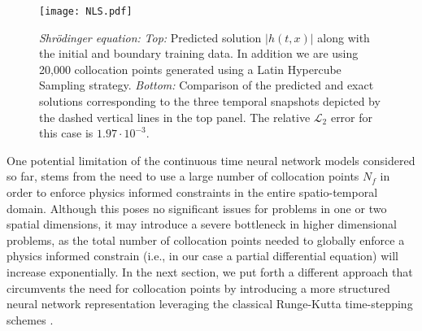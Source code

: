 \begin{figure}[!t]
\texttt{[image: NLS.pdf]}
\caption{{\em Shr\"{o}dinger equation:} {\it Top:} Predicted solution $|h(t,x)|$ along with the initial and boundary training data. In addition we are using 20,000 collocation points generated using a Latin Hypercube Sampling strategy. {\it Bottom:} Comparison of the predicted and exact solutions corresponding to  the three temporal snapshots depicted by the dashed vertical lines in the top panel. The relative $\mathcal{L}_{2}$ error for this case is $1.97 \cdot 10^{-3}$.}
\label{fig:NLS}
\end{figure}

One potential limitation of the continuous time neural network models considered so far, stems from the need to use a large number of collocation points $N_f$ in order to enforce physics informed constraints in the entire spatio-temporal domain. Although this poses no significant issues for problems in one or two spatial dimensions, it may introduce a severe bottleneck in higher dimensional problems, as the total number of collocation points needed to globally enforce a physics informed constrain (i.e., in our case a partial differential equation) will increase exponentially. In the next section, we put forth a different approach that circumvents the need for collocation points by introducing a more structured neural network representation leveraging the classical Runge-Kutta time-stepping schemes \cite{iserles2009first}.
